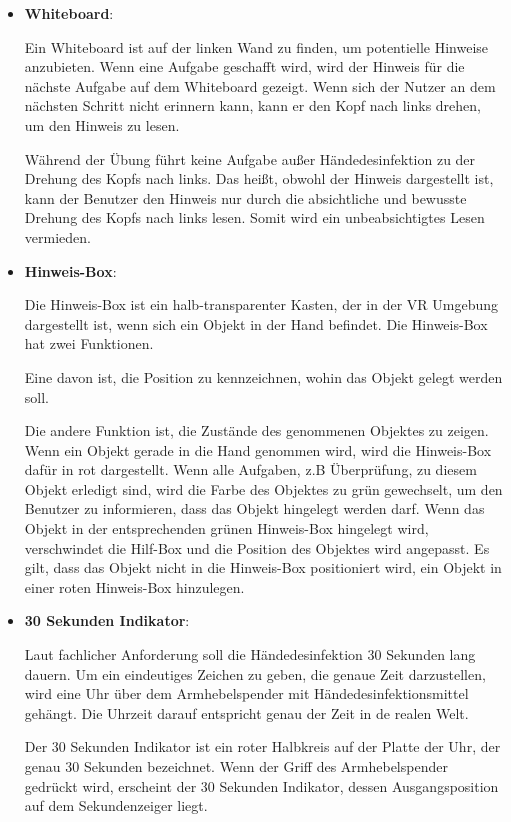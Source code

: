   \begin{itemize}
      \item \textbf{Whiteboard}:
      
      Ein Whiteboard ist auf der linken Wand zu finden, um potentielle Hinweise anzubieten. Wenn eine Aufgabe geschafft wird, wird der Hinweis für die nächste Aufgabe auf dem Whiteboard gezeigt. Wenn sich der Nutzer an dem nächsten Schritt nicht erinnern kann, kann er den Kopf nach links drehen, um den Hinweis zu lesen.
      
      Während der Übung führt keine Aufgabe außer Händedesinfektion zu der Drehung des Kopfs nach links. Das heißt, obwohl der Hinweis dargestellt ist, kann der Benutzer den Hinweis nur durch die absichtliche und bewusste Drehung des Kopfs nach links lesen. Somit wird ein unbeabsichtigtes Lesen vermieden.
      
      \item \textbf{Hinweis-Box}:
      
      Die Hinweis-Box ist ein halb-transparenter Kasten, der in der VR Umgebung dargestellt ist, wenn sich ein Objekt in der Hand befindet. Die Hinweis-Box hat zwei Funktionen.
      
      Eine davon ist, die Position zu kennzeichnen, wohin das Objekt gelegt werden soll.
      
      Die andere Funktion ist, die Zustände des genommenen Objektes zu zeigen. Wenn ein Objekt gerade in die Hand genommen wird, wird die Hinweis-Box dafür in rot dargestellt. Wenn alle Aufgaben, z.B Überprüfung, zu diesem Objekt erledigt sind, wird die Farbe des Objektes zu grün gewechselt, um den Benutzer zu informieren, dass das Objekt hingelegt werden darf. Wenn das Objekt in der entsprechenden grünen Hinweis-Box hingelegt wird, verschwindet die Hilf-Box und die Position des Objektes wird angepasst. Es gilt, dass das Objekt nicht in die Hinweis-Box positioniert wird, ein Objekt in einer roten Hinweis-Box hinzulegen. %
      
      \item \textbf{30 Sekunden Indikator}:
      
      Laut fachlicher Anforderung soll die Händedesinfektion 30 Sekunden lang dauern. Um ein eindeutiges Zeichen zu geben, die genaue Zeit darzustellen, wird eine Uhr über dem Armhebelspender mit Händedesinfektionsmittel gehängt. Die Uhrzeit darauf entspricht genau der Zeit in de realen Welt.
      
      Der 30 Sekunden Indikator ist ein roter Halbkreis auf der Platte der Uhr, der genau 30 Sekunden bezeichnet. Wenn der Griff des Armhebelspender gedrückt wird, erscheint der 30 Sekunden Indikator, dessen Ausgangsposition auf dem Sekundenzeiger liegt.
      

\end{itemize}
